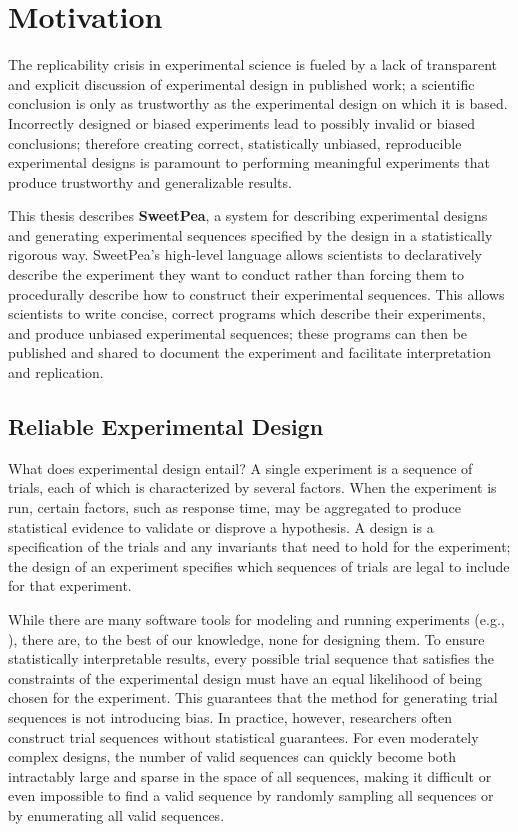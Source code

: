 
\chapter{Motivation}
 

The replicability crisis in experimental science is fueled by a lack of transparent and explicit discussion of experimental design in published work; a scientific conclusion is only as trustworthy as the experimental design on which it is based. Incorrectly designed or biased experiments lead to possibly invalid or biased conclusions; therefore creating correct, statistically unbiased, reproducible experimental designs is paramount to performing meaningful experiments that produce trustworthy and generalizable results.

This thesis describes \textbf{SweetPea}, a system for describing experimental designs and generating experimental sequences specified by the design in a statistically rigorous way. SweetPea's high-level language allows scientists to declaratively describe the experiment they want to conduct rather than forcing them to procedurally describe how to construct their experimental sequences. This allows scientists to write concise, correct programs which describe their experiments, and produce unbiased experimental sequences; these programs can then be published and shared to document the experiment and facilitate interpretation and replication.

\section{Reliable Experimental Design}

What does experimental design entail? A single experiment is a sequence of trials, each of which is characterized by several factors. When the experiment is run, certain factors, such as response time, may be aggregated to produce statistical evidence to validate or disprove a hypothesis. A design is a specification of the trials and any invariants that need to hold for the experiment; the design of an experiment specifies which sequences of trials are legal to include for that experiment.

While there are many software tools for modeling and running experiments (e.g., \cite{cohen1993psyscope} \cite{mathot2012opensesame} \cite{peirce2009generating}), there are, to the best of our knowledge, none for designing them. To ensure statistically interpretable results, every possible trial sequence that satisfies the constraints of the experimental design must have an equal likelihood of being chosen for the experiment. This guarantees that the method for generating trial sequences is not introducing bias. In practice, however, researchers often construct trial sequences without statistical guarantees. For even moderately complex designs, the number of valid sequences can quickly become both intractably large and sparse in the space of all sequences, making it difficult or even impossible to find a valid sequence by randomly sampling all sequences or by enumerating all valid sequences.

